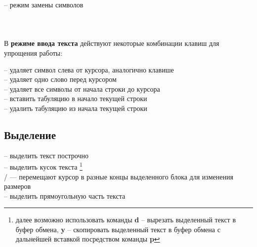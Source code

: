 \noindent
{}\\
\\
\\

\noindent
{}\\
\\
\\
\\

\noindent
{}\\
\\
\\
 – режим замены символов\\

\noindent
{}\\
\\
\\

В \textbf{режиме ввода текста} действуют некоторые комбинации клавиш для упрощения работы:

\noindent
{} -- удаляет символ слева от курсора, аналогично клавише \\
 -- удаляет одно слово перед курсором\\
 -- удаляет все символы от начала строки до курсора\\
 -- вставить табуляцию в начало текущей строки\\
 -- удалить табуляцию из начала текущей строки\\

\subsection*{Выделение}
\noindent
{} -- выделить текст построчно\\
 -- выделить кусок текста \footnote{далее возможно использовать команды \textbf{d} -- вырезать выделенный текст в буфер обмена, \textbf{y} -- скопировать выделенный текст в буфер обмена с дальнейшей вставкой посредством команды \textbf{p}}\\
/ — перемещают курсор в разные концы выделенного блока для изменения размеров\\
 -- выделить прямоугольную часть текста\\

